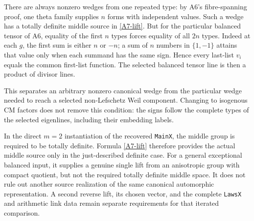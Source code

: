 There are always nonzero wedges from one repeated type: by A6's
fibre-spanning proof, one theta family supplies $n$ forms with
independent values. Such a wedge has a totally definite middle
source in \eqref{A7-lift}. But for the particular balanced tensor
of A6, equality of the first $n$ types forces equality of all
$2n$ types. Indeed at each $g$, the first sum is either $n$ or
$-n$; a sum of $n$ numbers in $\{1,-1\}$ attains that value
only when each summand has the same sign. Hence every last-list
$v_i$ equals the common first-list function. The selected
balanced tensor line is then a product of divisor lines.

This separates an arbitrary nonzero canonical wedge from the
particular wedge needed to reach a selected non-Lefschetz
Weil component. Changing to isogenous CM factors does not
remove this condition: the signs follow the complete types of
the selected eigenlines, including their embedding labels.

In the direct $m=2$ instantiation of the recovered
\texttt{MainX}, the middle group is required to be totally
definite. Formula \eqref{A7-lift} therefore provides the actual
middle source only in the just-described definite case.
For a general exceptional balanced input, it supplies a genuine
single lift from an anisotropic group with compact quotient,
but not the required totally definite middle space. It does
not rule out another source realization of the same canonical
automorphic representation. A second reverse lift, its chosen
vector, and the complete \texttt{LawsX} and arithmetic link data
remain separate requirements for that iterated comparison.
